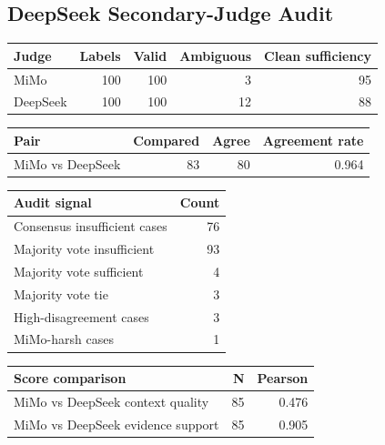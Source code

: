 \subsection{DeepSeek Secondary-Judge Audit}

\begin{longtable}{l r r r r}
\toprule
Judge & Labels & Valid & Ambiguous & Clean sufficiency \\
\midrule
MiMo & 100 & 100 & 3 & 95 \\
DeepSeek & 100 & 100 & 12 & 88 \\
\bottomrule
\end{longtable}

\begin{longtable}{l r r r}
\toprule
Pair & Compared & Agree & Agreement rate \\
\midrule
MiMo vs DeepSeek & 83 & 80 & 0.964 \\
\bottomrule
\end{longtable}

\begin{longtable}{l r}
\toprule
Audit signal & Count \\
\midrule
Consensus insufficient cases & 76 \\
Majority vote insufficient & 93 \\
Majority vote sufficient & 4 \\
Majority vote tie & 3 \\
High-disagreement cases & 3 \\
MiMo-harsh cases & 1 \\
\bottomrule
\end{longtable}

\begin{longtable}{l r r}
\toprule
Score comparison & N & Pearson \\
\midrule
MiMo vs DeepSeek context quality & 85 & 0.476 \\
MiMo vs DeepSeek evidence support & 85 & 0.905 \\
\bottomrule
\end{longtable}
